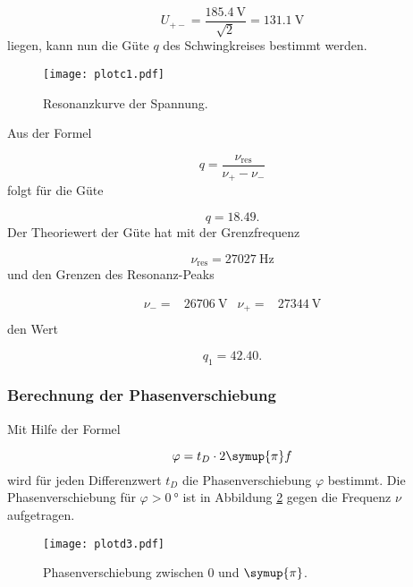 \begin{equation}
  U_{+-} = \frac{\SI{185.4}{\V}}{\sqrt{2}} = \SI{131.1}{\V}
\end{equation}
liegen, kann nun die Güte $q$ des Schwingkreises bestimmt werden.

\begin{figure}[h]
  \centering
  \texttt{[image: plotc1.pdf]}
  \caption{Resonanzkurve der Spannung.}
  \label{fig:plotc1}
\end{figure}

Aus der Formel

\begin{equation}
  q = \frac{\nu_\text{res}}{\nu_+ - \nu_-}
\end{equation}
folgt für die Güte

\begin{equation}
  q = 18.49.
\end{equation}
Der Theoriewert der Güte hat mit der Grenzfrequenz

\begin{equation}
  \nu_\text{res} = \SI{27027}{\hertz}
\end{equation}
und den Grenzen des Resonanz-Peaks

\begin{align}
  \nu_- = & \SI{26706}{\V} & \nu_+ = & \SI{27344}{\V} \\
\end{align}
den Wert

\begin{equation}
  q_1 = 42.40 .
\end{equation}

\subsubsection{Berechnung der Phasenverschiebung}

Mit Hilfe der Formel

\begin{equation}
  \varphi = t_D \cdot 2\symup{\pi}f
\end{equation}
wird für jeden Differenzwert $t_D$ die Phasenverschiebung $\varphi$ bestimmt.
Die Phasenverschiebung für $\varphi > \SI{0}{\degree}$ ist in Abbildung
\ref{fig:Phasegros} gegen die Frequenz $\nu$ aufgetragen.

\begin{figure}[h]
  \centering
  \texttt{[image: plotd3.pdf]}
  \caption{Phasenverschiebung zwischen $0$ und $\symup{\pi}$.}
  \label{fig:Phasegros}
\end{figure}

